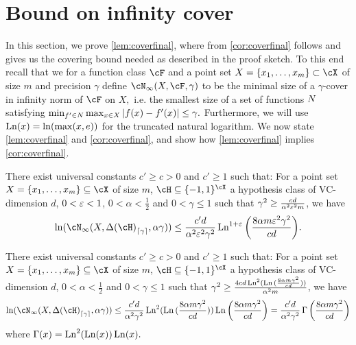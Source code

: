 \section{Bound on infinity cover}\label{sec:cover}

In this section, we prove \cref{lem:coverfinal}, where from \cref{cor:coverfinal} follows and gives us the covering bound needed as described in the proof sketch. To this end recall that we for a function class $ \cF $ and a point set $ X=\{ x_{1},\ldots ,x_{m} \}  \subset\cX$ of size $ m $ and precision $ \gamma $ define $ \cN_{\infty}(X,\cF,\gamma) $ to be the minimal size of a $ \gamma $-cover in infinity norm of $ \cF $ on $ X,$ i.e. the smallest size of a set of functions $ N $ satisfying $ \min_{f'\in N}\max_{x\in X} |f(x)-f'(x)|\leq \gamma .$ Furthermore, we will use $ \operatorname{\mathrm{Ln}}(x)=\ln(\max(x,e)) $ for the truncated natural logarithm. We now state \cref{lem:coverfinal} and \cref{cor:coverfinal}, and show how \cref{lem:coverfinal} implies \cref{cor:coverfinal}.

\begin{lemma}\label{lem:coverfinal}
    There exist universal constants $ c'\geq c>0 $ and $ c'\geq 1 $  such that: For a point set $ X=\{ x_{1},\ldots,x_{m} \} \subseteq \cX $ of size $ m $, $ \cH \subseteq \{-1,1\}^{\cX}$ a hypothesis class of VC-dimension $ d $, $ 0<\varepsilon<1 $,     $ 0<\alpha<\frac{1}{2} $  and $ 0<\gamma\leq 1 $  such that $ \gamma^{2}\geq  \frac{cd}{\alpha^{2}\varepsilon^{2}m}$, we have 
   \begin{align}
       \ln(\cN_{\infty}(X,\dlh_{\left\lceil\gamma\right\rceil} ,\alpha \gamma)) \leq
       \frac{c'd}{\alpha^{2}\eps^{2}\gamma^{2}} \Ln^{1+\eps}{\left(  \frac{8\alpha m\eps^{2} \gamma^{2}}{cd} \right)}.
   \end{align}   
\end{lemma}

\begin{corollary}\label{cor:coverfinal}
    There exist universal constants $ c'\geq c>0 $ and $ c'\geq 1 $  such that: For a point set $ X=\{ x_{1},\ldots,x_{m} \} \subseteq \cX $ of size $ m $, $ \cH \subseteq \{-1,1\}^{\cX}$ a hypothesis class of VC-dimension $ d $,     $ 0<\alpha<\frac{1}{2} $  and $ 0<\gamma\leq 1 $  such that $ \gamma^{2}\geq \frac{4cd\operatorname{\mathrm{Ln}}^{2}(\operatorname{\mathrm{Ln}}{ ( \frac{8\alpha m \gamma^{2}}{cd}) }) }{\alpha^{2}m}$, we have 
   \begin{align}
    \ln(\cN_{\infty}(X,\dlh_{\left\lceil\gamma\right\rceil} ,\alpha \gamma)) \leq \frac{c'd}{\alpha^{2}\gamma^{2}}\Ln^{2}(\Ln{(  \frac{8\alpha m \gamma^{2}}{cd})}) \Ln{\left(  \frac{8\alpha m\gamma^{2}}{cd} \right)}=\frac{c'd}{\alpha^{2}\gamma^{2}}\func\left( \frac{8\alpha m \gamma^{2}}{cd}\right)
   \end{align}
   where $ \operatorname{\Gamma}(x)=\operatorname{\mathrm{Ln}}^{2}(\operatorname{\mathrm{Ln}}(x))\operatorname{\mathrm{Ln}}(x).$     
\end{corollary}

